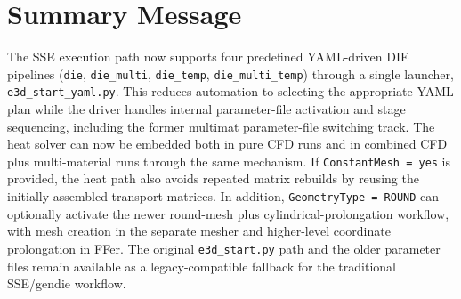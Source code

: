 \documentclass[11pt,a4paper]{article}
\begin{document}
\section*{Summary Message}

The SSE execution path now supports four predefined YAML-driven DIE pipelines
(\texttt{die}, \texttt{die\_multi}, \texttt{die\_temp}, \texttt{die\_multi\_temp}) through a single launcher,
\texttt{e3d\_start\_yaml.py}. This reduces automation to selecting the appropriate YAML plan while the driver
handles internal parameter-file activation and stage sequencing, including the former multimat parameter-file
switching track. The heat solver can now be embedded both in pure CFD runs and in combined CFD plus
multi-material runs through the same mechanism. If \texttt{ConstantMesh = yes} is provided, the heat path also
avoids repeated matrix rebuilds by reusing the initially assembled transport matrices. In addition,
\texttt{GeometryType = ROUND} can optionally activate the newer round-mesh plus cylindrical-prolongation workflow,
with mesh creation in the separate mesher and higher-level coordinate prolongation in FFer. The original
\texttt{e3d\_start.py} path and the older parameter files remain available as a legacy-compatible fallback for the
traditional SSE/gendie workflow.
\end{document}

